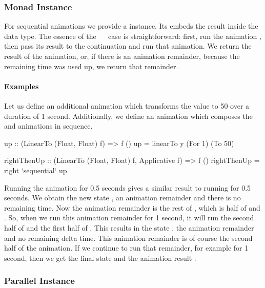 \subsubsection{Monad Instance}

For sequential animations we provide a  instance. Its  embeds the
result  inside the  data type. The essence of the
~\hs{>>=}~ case is straightforward: first, run the animation
, then pass its result to the continuation  and run that animation.
We return the result of the animation, or, if there is an animation remainder,
because the remaining time was used up, we return that remainder.

\paragraph{Examples}

Let us define an additional animation  which transforms the  value to 50 over a duration of 1 second. Additionally, we define an animation  which composes the  and  animations in sequence.

\begin{code}
up :: (LinearTo (Float, Float) f) => f ()
up = linearTo y (For 1) (To 50)

rightThenUp :: (LinearTo (Float, Float) f, Applicative f) => f ()
rightThenUp = right `sequential` up
\end{code}

Running the  animation for 0.5 seconds gives a similar result
to running  for 0.5 seconds. We obtain the new state , an animation remainder  and there is no remaining time.
Now the animation remainder is the rest of ,
which is half of  and . So,
when we run this animation remainder for 1 second, it will run the second half
of  and the first half of .  This results in the state
, the animation remainder  and no remaining delta time.
This animation remainder is of course the second half of the  animation.
If we continue to run that remainder, for example for 1 second, then we get the
final state  and the animation result \hs{()}.

\subsubsection{Parallel Instance}

